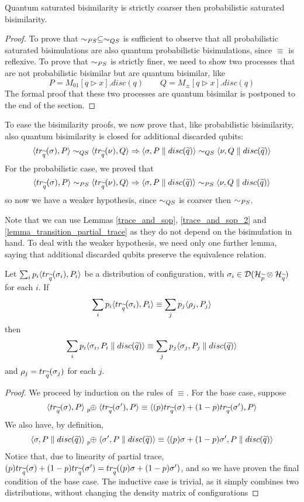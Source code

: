 \begin{theorem}
Quantum saturated bisimilarity is strictly coarser then probabilistic saturated bisimilarity.
\end{theorem}
\begin{proof}
To prove that $\sim_{PS} \subseteq \sim_{QS}$ is sufficient to observe that all probabilistic saturated bisimulations are also quantum probabilistic bisimulations, since $\equiv$ is reflexive. To prove that $\sim_{PS}$ is strictly finer, we need to show two processes that are not probabilistic bisimilar but are quantum bisimilar, like
\[ P = M_{01}[q \rhd x].disc(q) \qquad Q = M_{\pm}[q \rhd x].disc(q)\]  The formal proof that these two processes are quantum bisimilar is postponed to the end of the section.
\end{proof}

To ease the bisimilarity proofs, we now prove that, like probabilistic bisimilarity, also quantum bisimilarity is closed for additional discarded qubits: 
\[\langle tr_{\widetilde{q}}(\sigma), P\rangle \sim_{QS} \langle tr_{\widetilde{q}}(\nu), Q\rangle \Rightarrow \langle\sigma, P\parallel disc(\widetilde{q})\rangle \sim_{QS} \langle\nu, Q\parallel disc(\widetilde{q})\rangle\] 
For the probabilistic case, we proved that \[\langle tr_{\widetilde{q}}(\sigma), P\rangle \sim_{PS} \langle tr_{\widetilde{q}}(\nu), Q\rangle \Rightarrow \langle\sigma, P\parallel disc(\widetilde{q})\rangle \sim_{PS} \langle\nu, Q\parallel disc(\widetilde{q})\rangle\] so now we have a weaker hypothesis, since $\sim_{QS}$ is coarser then $\sim_{PS}$.

Note that we can use Lemmas \ref{trace_and_sop}, \ref{trace_and_sop_2} and \ref{lemma_transition_partial_trace} as they do not depend on the bisimulation in hand. To deal with the weaker hypothesis, we need only one further lemma, saying that  additional discarded qubits preserve the equivalence relation.

\begin{lemma}\label{lemma_quantum_equivalence_partial_trace}
Let $\sum_i p_i \langle tr_{\widetilde{q}}(\sigma_i), P_i\rangle$ be a distribution of configuration, with $\sigma_i \in \mathcal{D}(\mathcal{H}_{\widetilde{p}} \otimes \mathcal{H}_{\widetilde{q}})$ for each $i$.  If \[\sum_i p_i \langle tr_{\widetilde{q}}(\sigma_i), P_i\rangle \equiv \sum_j p_j \langle\rho_j, P_j\rangle\]
then 
\[\sum_i p_i \langle\sigma_i, P_i\parallel disc(\widetilde{q})\rangle \equiv \sum_j p_j \langle\sigma_j, P_j\parallel disc(\widetilde{q})\rangle\]
and $\rho_j = tr_{\widetilde{q}}(\sigma_j)$ for each $j$.
\end{lemma}
\begin{proof}
We proceed by induction on the rules of $\equiv$. For the base case, suppose \[
\confw{\trQ(\sigma), P} \psum{p} \confw{\trQ(\sigma'), P} \equiv \confw{(p)\trQ(\sigma) + (1-p)\trQ(\sigma'), P}\]
We also have, by definition,  \[\confw{\sigma, P\parallel \discQ} \psum{p} \confw{\sigma', P\parallel \discQ} \equiv \confw{(p)\sigma + (1-p)\sigma', P\parallel \discQ}\]
Notice that, due to linearity of partial trace, $(p)tr_{\widetilde{q}}(\sigma) + (1-p)tr_{\widetilde{q}}(\sigma') = tr_{\widetilde{q}}((p)\sigma + (1-p)\sigma')$, and so we have proven the final condition of the base case.
The inductive case is trivial, as it simply combines two distributions, without changing the density matrix of configurations
\end{proof}

